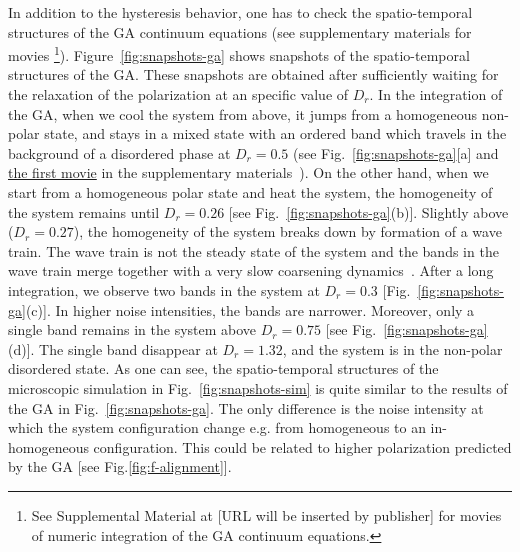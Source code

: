\documentclass[reprint,floatfix,amsmath,amssymb,aps,pre,showkeys,showpacs,superscriptaddress]{revtex4-1}
\begin{document}
In addition to the hysteresis behavior, one has to check the spatio-temporal structures of the GA continuum equations (see supplementary materials for movies \footnote{See Supplemental Material at [URL will be inserted by publisher] for movies of numeric integration of the GA continuum equations.}). Figure~\ref{fig:snapshots-ga} shows snapshots of the spatio-temporal structures of the GA. These snapshots are obtained after sufficiently waiting for the relaxation of the polarization at an specific value of $D_r$. In the integration of the GA, when we cool the system from above, it jumps from a homogeneous non-polar state, and stays in a mixed state with an ordered band which travels in the background of a disordered phase at $D_r=0.5$ (see Fig.~\ref{fig:snapshots-ga}[a] and \href{SI1-cooling-GA.mp4}{the first movie} in the supplementary materials~\cite{Note1}). On the other hand, when we start from a homogeneous polar state and heat the system, the homogeneity of the system remains until $D_r=0.26$ [see Fig.~\ref{fig:snapshots-ga}(b)]. Slightly above ($D_r=0.27$), the homogeneity of the system breaks down by formation of a wave train. The wave train is not the steady state of the system and the bands in the wave train merge together with a very slow coarsening dynamics~\cite{solon2015pattern}. After a long integration, we observe two bands in the system at $D_r=0.3$ [Fig.~\ref{fig:snapshots-ga}(c)]. In higher noise intensities, the bands are narrower. Moreover, only a single band remains in the system above $D_r=0.75$ [see Fig.~\ref{fig:snapshots-ga}(d)]. The single band disappear at $D_r=1.32$, and the system is in the non-polar disordered state. As one can see, the spatio-temporal structures of the microscopic simulation in Fig.~\ref{fig:snapshots-sim} is quite similar to the results of the GA in Fig.~\ref{fig:snapshots-ga}. The only difference is the noise intensity at which the system configuration change e.g. from homogeneous to an in-homogeneous configuration. This could be related to higher polarization predicted by the GA [see Fig.\ref{fig:f-alignment}].
\end{document}
